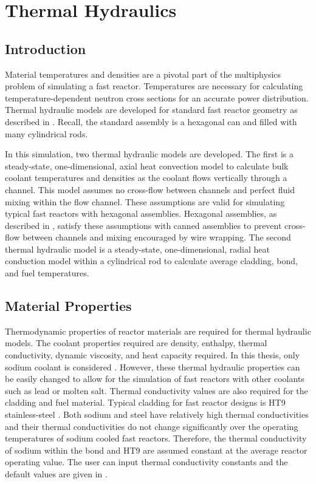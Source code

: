 \chapter{Thermal Hydraulics}
\label{ch:thermalHydraulics}

\section{Introduction}
  Material temperatures and densities are a pivotal part of the multiphysics
  problem of simulating a fast reactor. Temperatures are necessary for
  calculating temperature-dependent neutron cross sections for an accurate power
  distribution. Thermal hydraulic models are developed for standard fast
  reactor geometry as described in . Recall, the
  standard assembly is a hexagonal can and filled with many cylindrical rods. 

  In this simulation, two thermal hydraulic models are developed. The first is a
  steady-state, one-dimensional, axial heat convection model to calculate bulk
  coolant temperatures and densities as the coolant flows vertically through a
  channel. This model assumes no cross-flow between channels and perfect fluid
  mixing within the flow channel. These assumptions are valid for simulating
  typical fast reactors with hexagonal assemblies. Hexagonal assemblies, as
  described in , satisfy these assumptions with
  canned assemblies to prevent cross-flow between channels and mixing encouraged
  by wire wrapping. The second thermal hydraulic model is a steady-state,
  one-dimensional, radial heat conduction model within a cylindrical rod to
  calculate average cladding, bond, and fuel temperatures.

\section{Material Properties}
  \label{sec:material_properties}
  Thermodynamic properties of reactor materials are required for thermal
  hydraulic models. The coolant properties required are density, enthalpy,
  thermal conductivity, dynamic viscosity, and heat capacity required. In this
  thesis, only sodium coolant is considered \cite{sodiumProp}. However, these
  thermal hydraulic properties can be easily changed to allow for the simulation
  of fast reactors with other coolants such as lead or molten salt. Thermal
  conductivity values are also required for the cladding and fuel material.
  Typical cladding for fast reactor designs is HT9 stainless-steel
  \cite{ht9Prop}. Both sodium and steel have relatively high thermal
  conductivities and their thermal conductivities do not change significantly
  over the operating temperatures of sodium cooled fast reactors. Therefore, the
  thermal conductivity of sodium within the bond \cite{sodiumProp} and HT9
  \cite{ht9Prop} are assumed constant at the average reactor operating value.
  The user can input thermal conductivity constants and the default values are
  given in .
    
